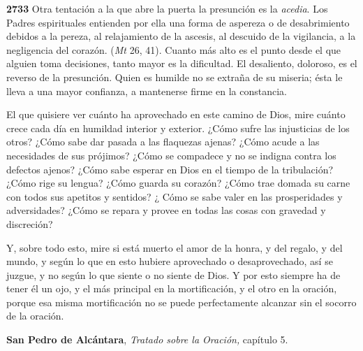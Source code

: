 \textbf{2733} Otra tentación a la que abre la puerta la presunción es la \emph{acedia}. Los Padres espirituales entienden por ella una forma de aspereza o de desabrimiento debidos a la pereza, al relajamiento de la ascesis, al descuido de la vigilancia, a la negligencia del corazón.  (\emph{Mt} 26, 41). Cuanto más alto es el punto desde el que alguien toma decisiones, tanto mayor es la dificultad. El desaliento, doloroso, es el reverso de la presunción. Quien es humilde no se extraña de su miseria; ésta le lleva a una mayor confianza, a mantenerse firme en la constancia.

El que quisiere ver cuánto ha aprovechado en este camino de Dios, mire cuánto crece cada día en humildad interior y exterior. ¿Cómo sufre las injusticias de los otros? ¿Cómo sabe dar pasada a las flaquezas ajenas? ¿Cómo acude a las necesidades de sus prójimos? ¿Cómo se compadece y no se indigna contra los defectos ajenos? ¿Cómo sabe esperar en Dios en el tiempo de la tribulación? ¿Cómo rige su lengua? ¿Cómo guarda su corazón? ¿Cómo trae domada su carne con todos sus apetitos y sentidos? ¿ Cómo se sabe valer en las prosperidades y adversidades? ¿Cómo se repara y provee en todas las cosas con gravedad y discreción?

Y, sobre todo esto, mire si está muerto el amor de la honra, y del regalo, y del mundo, y según lo que en esto hubiere aprovechado o desaprovechado, así se juzgue, y no según lo que siente o no siente de Dios. Y por esto siempre ha de tener él un ojo, y el más principal en la mortificación, y el otro en la oración, porque esa misma mortificación no se puede perfectamente alcanzar sin el socorro de la oración.

\textbf{San Pedro de Alcántara}, \emph{Tratado sobre la Oración,} capítulo 5.